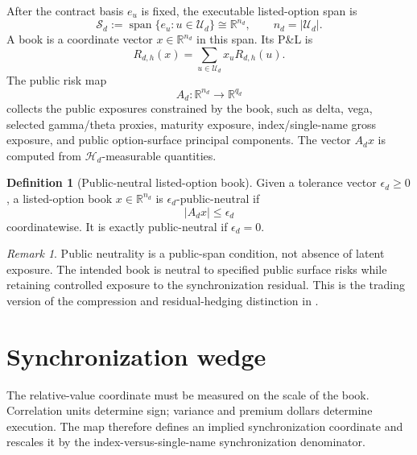 \documentclass[11pt,a4paper]{amsart}
\theoremstyle{plain}
\theoremstyle{definition}
\newtheorem{definition}[theorem]{Definition}
\theoremstyle{remark}
\newtheorem{remark}[theorem]{Remark}
\DeclareMathOperator{\Span}{span}
\newcommand{\R}{\mathbb{R}}
\newcommand{\cH}{\mathcal{H}}
\newcommand{\cS}{\mathcal{S}}
\newcommand{\cU}{\mathcal{U}}
\begin{document}
After the contract basis \(e_u\) is fixed, the executable listed-option span is
\[
        \cS_d:=\Span\{e_u:u\in\cU_d\}\cong\R^{n_d},
        \qquad n_d=|\cU_d|.
\]
A book is a coordinate vector \(x\in\R^{n_d}\) in this span.  Its P\&L is
\[
        R_{d,h}(x)=\sum_{u\in\cU_d}x_u R_{d,h}(u).
\]
The public risk map
\[
        A_d:\R^{n_d}\to\R^{q_d}
\]
collects the public exposures constrained by the book, such as delta, vega, selected
gamma/theta proxies, maturity exposure, index/single-name gross exposure, and public
option-surface principal components.  The vector \(A_d x\) is computed from \(\cH_d\)-measurable
quantities.

\begin{definition}[Public-neutral listed-option book]\label{def:public-neutral-book}
Given a tolerance vector \(\epsilon_d\ge0\), a listed-option book \(x\in\R^{n_d}\) is
\(\epsilon_d\)-public-neutral if
\[
        |A_d x|\le \epsilon_d
\]
coordinatewise.  It is exactly public-neutral if \(\epsilon_d=0\).
\end{definition}

\begin{remark}
Public neutrality is a public-span condition, not absence of latent exposure.  The intended book is
neutral to specified public surface risks while retaining controlled exposure to the synchronization
residual.  This is the trading version of the compression and residual-hedging distinction in
\cite{vidal2026compression,vidal2026pricing}.
\end{remark}

\section{Synchronization wedge}\label{sec:sync-wedge}

The relative-value coordinate must be measured on the scale of the book.  Correlation units
determine sign; variance and premium dollars determine execution.  The map therefore
defines an implied synchronization coordinate and rescales it by the index-versus-single-name
synchronization denominator.
\end{document}
